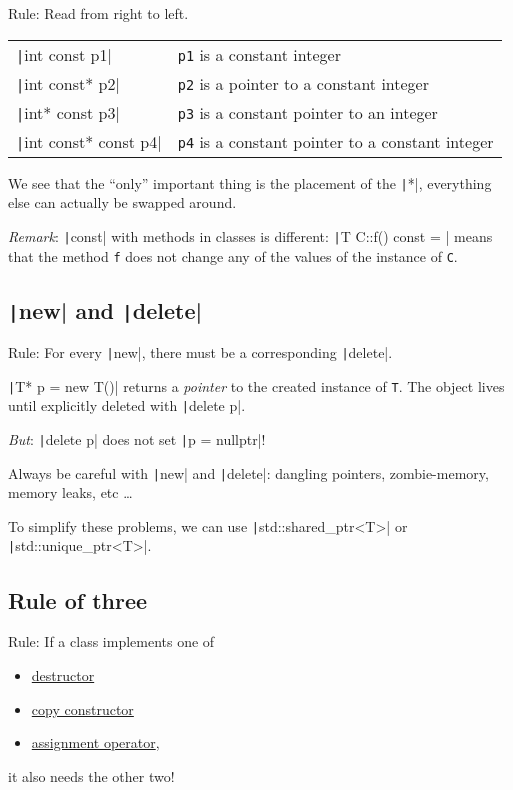 \documentclass[fontsize=9pt, paper=landscape]{scrartcl}
\begin{document}
\begin{multicols}{2}
Rule: Read from right to left.

\begin{tabular}{|l|l|}
	\hline
	\texttt|int const p1| & \texttt{p1} is a constant integer \\
	\texttt|int const* p2| & \texttt{p2} is a pointer to a constant integer \\
	\texttt|int* const p3| & \texttt{p3} is a constant pointer to an integer \\
	\texttt|int const* const p4| & \texttt{p4} is a constant pointer to a constant integer \\
	\hline
\end{tabular}

We see that the ``only'' important thing is the placement of the \texttt|*|, everything else can actually be swapped around.

\textit{Remark}: \texttt|const| with methods in classes is different: \texttt|T C::f() const = {}| means that the method \texttt{f} does not change any of the values of the instance of \texttt{C}.

\subsection{\texttt|new| and \texttt|delete|}

Rule: For every \texttt|new|, there must be a corresponding \texttt|delete|.

\texttt|T* p = new T()| returns a \textit{pointer} to the created instance of \texttt{T}. The object lives until explicitly deleted with \texttt|delete p|.

\textit{But}: \texttt|delete p| does not set \texttt|p = nullptr|!

Always be careful with \texttt|new| and \texttt|delete|: dangling pointers, zombie-memory, memory leaks, etc \dots

To simplify these problems, we can use \texttt|std::shared_ptr<T>| or \texttt|std::unique_ptr<T>|.

\subsection{Rule of three}

Rule: If a class implements one of
\begin{itemize}
	\item \hyperref[sec:destr]{destructor}
	\item \hyperref[sec:copy-constr]{copy constructor}
	\item \hyperref[sec:assign-op]{assignment operator},
\end{itemize}
it also needs the other two!


\end{multicols}
\end{document}
